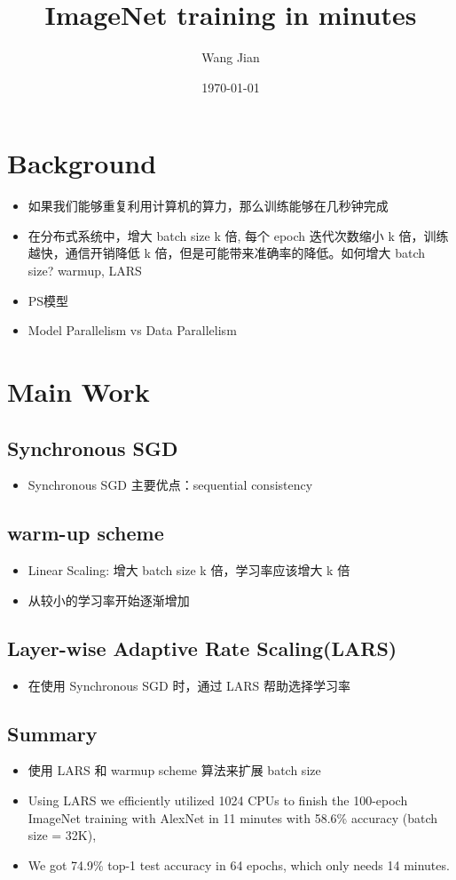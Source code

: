\documentclass[11pt]{article}
\author{Wang Jian}
\date{\today}
\title{ImageNet training in minutes}
\begin{document}
\maketitle
\tableofcontents

\section{Background}
\label{sec:orgdf0aafd}
\begin{itemize}
\item 如果我们能够重复利用计算机的算力，那么训练能够在几秒钟完成
\item 在分布式系统中，增大 batch size k 倍, 每个 epoch 迭代次数缩小 k 倍，训练越快，通信开销降低 k 倍，但是可能带来准确率的降低。如何增大 batch size? warmup, LARS
\item PS模型
\item Model Parallelism vs Data Parallelism
\end{itemize}

\section{Main Work}
\label{sec:org6065034}
\subsection{Synchronous SGD}
\label{sec:orgbc66159}
\begin{itemize}
\item Synchronous SGD 主要优点：sequential consistency
\end{itemize}
\subsection{warm-up scheme}
\label{sec:org660ccce}
\begin{itemize}
\item Linear Scaling: 增大 batch size k 倍，学习率应该增大 k 倍
\item 从较小的学习率开始逐渐增加
\end{itemize}
\subsection{Layer-wise Adaptive Rate Scaling(LARS)}
\label{sec:orge4a057a}
\begin{itemize}
\item 在使用 Synchronous SGD 时，通过 LARS 帮助选择学习率
\end{itemize}
\subsection{Summary}
\label{sec:orgc6353e6}
\begin{itemize}
\item 使用 LARS 和 warmup scheme 算法来扩展 batch size
\item Using LARS we efficiently utilized 1024 CPUs to finish the 100-epoch ImageNet training with AlexNet in 11 minutes with 58.6\% accuracy (batch size = 32K),
\item We got 74.9\% top-1 test accuracy in 64 epochs, which only needs 14 minutes.
\end{itemize}
\end{document}
